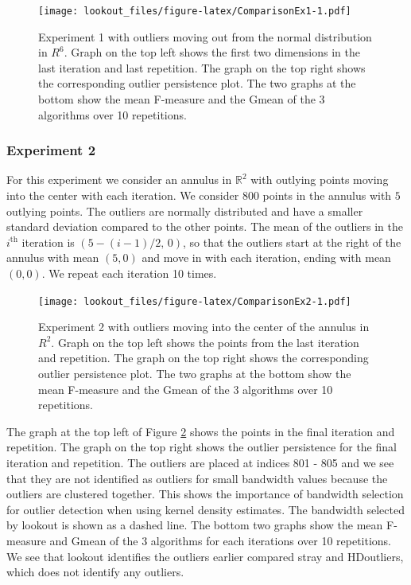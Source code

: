 \documentclass[11pt,a4paper,]{article}
\theoremstyle{definition}
\theoremstyle{definition}
\theoremstyle{definition}
\theoremstyle{remark}
\begin{document}
\begin{figure}
\centering
\texttt{[image: lookout\_files/figure-latex/ComparisonEx1-1.pdf]}
\caption{\label{fig:ComparisonEx1}Experiment 1 with outliers moving out from the normal distribution in \(R^6\). Graph on the top left shows the first two dimensions in the last iteration and last repetition. The graph on the top right shows the corresponding outlier persistence plot. The two graphs at the bottom show the mean F-measure and the Gmean of the 3 algorithms over 10 repetitions.}
\end{figure}

\hypertarget{experiment-2}{%
\subsubsection{\texorpdfstring{Experiment 2 \label{sec:exp2}}{Experiment 2 }}\label{experiment-2}}

For this experiment we consider an annulus in \(\mathbb{R}^2\) with outlying points moving into the center with each iteration. We consider \(800\) points in the annulus with \(5\) outlying points. The outliers are normally distributed and have a smaller standard deviation compared to the other points. The mean of the outliers in the \(i^{\text{th}}\) iteration is \(\left( 5 - (i-1) /2, \, 0 \right)\), so that the outliers start at the right of the annulus with mean \((5,0)\) and move in with each iteration, ending with mean \((0,0)\). We repeat each iteration 10 times.

\begin{figure}
\centering
\texttt{[image: lookout\_files/figure-latex/ComparisonEx2-1.pdf]}
\caption{\label{fig:ComparisonEx2}Experiment 2 with outliers moving into the center of the annulus in \(R^2\). Graph on the top left shows the points from the last iteration and repetition. The graph on the top right shows the corresponding outlier persistence plot. The two graphs at the bottom show the mean F-measure and the Gmean of the 3 algorithms over 10 repetitions.}
\end{figure}

The graph at the top left of Figure \ref{fig:ComparisonEx2} shows the points in the final iteration and repetition. The graph on the top right shows the outlier persistence for the final iteration and repetition. The outliers are placed at indices 801 - 805 and we see that they are not identified as outliers for small bandwidth values because the outliers are clustered together. This shows the importance of bandwidth selection for outlier detection when using kernel density estimates. The bandwidth selected by lookout is shown as a dashed line. The bottom two graphs show the mean F-measure and Gmean of the 3 algorithms for each iterations over 10 repetitions. We see that lookout identifies the outliers earlier compared stray and HDoutliers, which does not identify any outliers.
\end{document}
